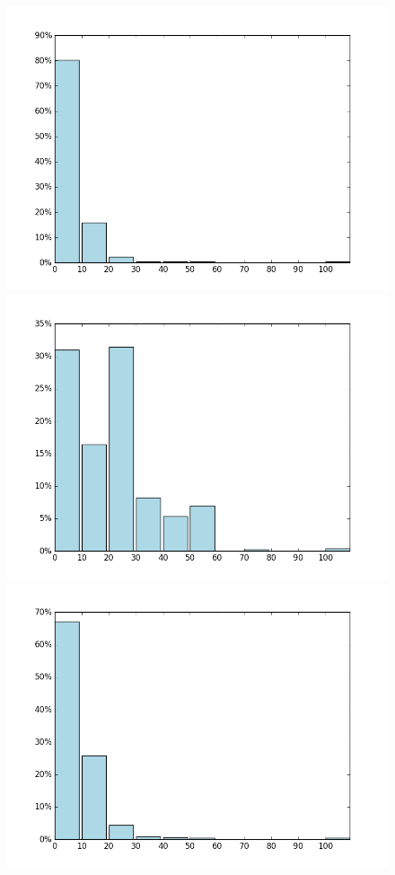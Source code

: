 \begin{figure}[H]
	\includegraphics[width=\linewidth]{img/reddit_vocab_analyze_50k_perc.PNG}
	\centering
	\small
	\endminipage\hfill
	\includegraphics[width=\linewidth]{img/opus_vocab_analyze_50k_perc.PNG}
	\centering
	\small
	\endminipage\hfill
	\includegraphics[width=\linewidth]{img/reddit_vocab_analyze_25k_perc.PNG}

\end{figure}
